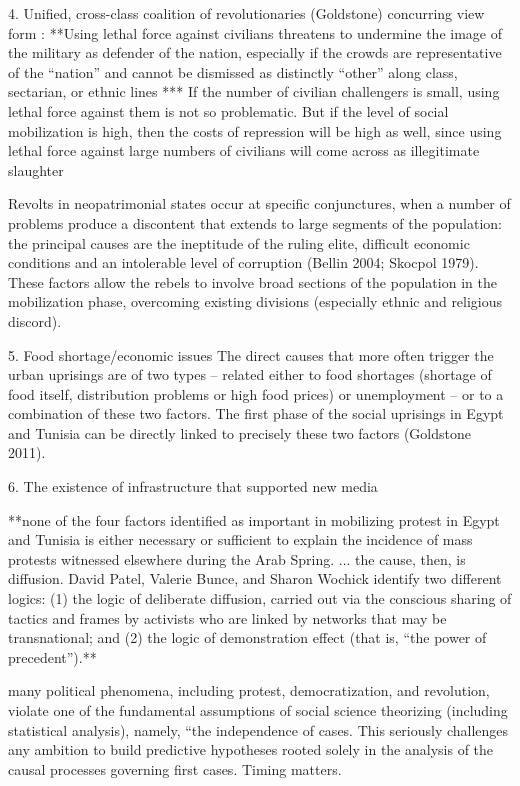	4. Unified, cross-class coalition of revolutionaries (Goldstone)
		concurring view form \cite{bellin_reconsidering_2012}:
			**Using lethal force against civilians threatens to undermine the image of the military as defender of the nation, especially if the crowds are representative of the “nation” and cannot be dismissed as distinctly “other” along class, sectarian, or ethnic lines ***
			If the number of civilian challengers is small, using lethal force against them is not so problematic. But if the level of social mobilization is high, then the costs of repression will be high as well, since using lethal force against large numbers of civilians will come across as illegitimate slaughter
			
		\cite{comunello_will_2012}
			Revolts in neopatrimonial states occur at specific conjunctures, when a number of problems produce a discontent that extends to large segments of the population: the principal causes are the ineptitude of the ruling elite, difficult economic conditions and an intolerable level of corruption (Bellin 2004; Skocpol 1979). These factors allow the rebels to involve broad sections of the population in the mobilization phase, overcoming existing divisions (especially ethnic and religious discord).
		
	5. Food shortage/economic issues
		\cite{comunello_will_2012}
			The direct causes that more often trigger the urban uprisings are of two types – related either to food shortages (shortage of food itself, distribution problems or high food prices) or unemployment – or to a combination of these two factors. The first phase of the social uprisings in Egypt and Tunisia can be directly linked to precisely these two factors (Goldstone 2011).

	6. The existence of infrastructure that supported new media 
		
	\cite{bellin_reconsidering_2012}
		**none of the four factors identified as important in mobilizing protest in Egypt and Tunisia is either necessary or sufficient to explain the incidence of mass protests witnessed elsewhere during the Arab Spring. ... the cause, then, is diffusion.  David Patel, Valerie Bunce, and Sharon Wochick identify two different logics: (1) the logic of deliberate diffusion, carried out via the conscious sharing of tactics and frames by activists who are linked by networks that may be transnational; and (2) the logic of demonstration effect (that is, “the power of precedent”).**

			many political phenomena, including protest, democratization, and revolution, violate one of the fundamental assumptions of social science theorizing (including statistical analysis), namely, “the independence of cases. This seriously challenges any ambition to build predictive hypotheses rooted solely in the analysis of the causal processes governing first cases. Timing matters.

